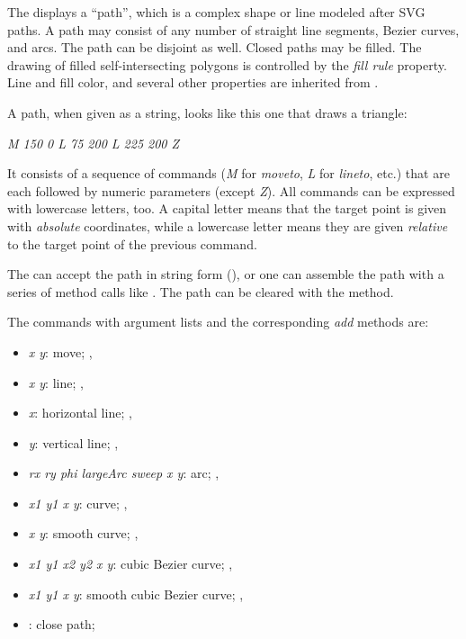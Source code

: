 The  displays a ``path'', which is a complex shape or line modeled after SVG
paths. A path may consist of any number of straight line segments, Bezier
curves, and arcs. The path can be disjoint as well. Closed paths may be filled.
The drawing of filled self-intersecting polygons is controlled by the
\textit{fill rule} property. Line and fill color, and several other properties
are inherited from .

A path, when given as a string, looks like this one that draws a triangle:

\textit{M 150 0 L 75 200 L 225 200 Z}

It consists of a sequence of commands (\textit{M} for \textit{moveto},
\textit{L} for \textit{lineto}, etc.) that are each followed by numeric
parameters (except \textit{Z}). All commands can be expressed with
lowercase letters, too. A capital letter means that the target point is
given with \textit{absolute} coordinates, while a lowercase letter means they are
given \textit{relative} to the target point of the previous command.

The  can accept the path in string form (),
or one can assemble the path with a series of method calls like
. The path can be cleared with the 
method.

The commands with argument lists and the corresponding \textit{add} methods are:

\begin{itemize}
\item {} \textit{x y}: move; , 
\item {} \textit{x y}: line; , 
\item {} \textit{x}: horizontal line; , 
\item {} \textit{y}: vertical line; , 
\item {} \textit{rx ry phi largeArc sweep x y}: arc; , 
\item {} \textit{x1 y1 x y}: curve; , 
\item {} \textit{x y}: smooth curve; , 
\item {} \textit{x1 y1 x2 y2 x y}: cubic Bezier curve; , 
\item {} \textit{x1 y1 x y}: smooth cubic Bezier curve; , 
\item {}: close path; 
\end{itemize}

